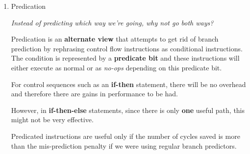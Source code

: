 \documentclass[12pt]{article}
\newenvironment{QandA}{\begin{enumerate}[label=\bfseries\arabic*.]\bfseries}
                      {\end{enumerate}}
\newenvironment{answered}{\par\quad\normalfont}{}
\begin{document}
\begin{QandA}
\ 

\item Predication
\begin{answered}
\textit{Instead of predicting which way we're going, why not go both ways?}

Predication is an \textbf{alternate view} that attempts to get rid of branch prediction by rephrasing control flow instructions as conditional instructions. The condition is represented by a \textbf{predicate bit} and these instructions will either execute as normal or as \textit{no-ops} depending on this predicate bit.

For control sequences such as an \textbf{if-then} statement, there will be no overhead and therefore there are gains in performance to be had. 

However, in \textbf{if-then-else} statements, since there is only \textbf{one} useful path, this might not be very effective. 

Predicated instructions are useful only if the number of cycles saved is more than the mis-prediction penalty if we were using regular branch predictors. 

\end{answered}

\end{QandA}

\newpage 
\end{document}
